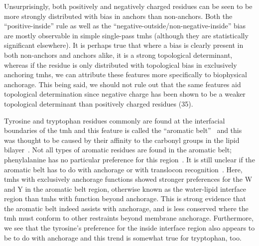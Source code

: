 Unsurprisingly, both positively and negatively charged residues can be seen to be more strongly distributed with bias in anchors than non-anchors.
Both the ``positive-inside'' rule as well as the ``negative-outside/non-negative-inside'' bias are mostly observable in simple single-pass \gls{tmh}s (although they are statistically significant elsewhere).
It is perhaps true that where a bias is clearly present in both non-anchors and anchors alike, it is a strong topological determinant, whereas if the residue is only distributed with topological bias in exclusively anchoring \gls{tmh}s, we can attribute these features more specifically to biophysical anchorage.
This being said, we should not rule out that the same features aid topological determination since negative charge has been shown to be a weaker topological determinant than positively charged residues (35).

Tyrosine and tryptophan residues commonly are found at the interfacial boundaries of the \gls{tmh} and this feature is called the ``aromatic belt''~\cite{Sharpe2010, Baeza-Delgado2013, Granseth2005, Nilsson2005a, Hessa2005} and this was thought to be caused by their affinity to the carbonyl groups in the lipid bilayer~\cite{Killian2000}.
Not all types of aromatic residues are found in the aromatic belt; phenylalanine has no particular preference for this region~\cite{Granseth2005, Braun1999}.
It is still unclear if the aromatic belt has to do with anchorage or with translocon recognition~\cite{Baeza-Delgado2013}.
Here, \gls{tmh}s with exclusively anchorage functions showed stronger preferences for the W and Y in the aromatic belt region, otherwise known as the water-lipid interface region than \gls{tmh}s with function beyond anchorage.
This is strong evidence that the aromatic belt indeed assists with anchorage, and is less conserved where the \gls{tmh} must conform to other restraints beyond membrane anchorage.
Furthermore, we see that the tyrosine's preference for the inside interface region also appears to be to do with anchorage and this trend is somewhat true for tryptophan, too.

